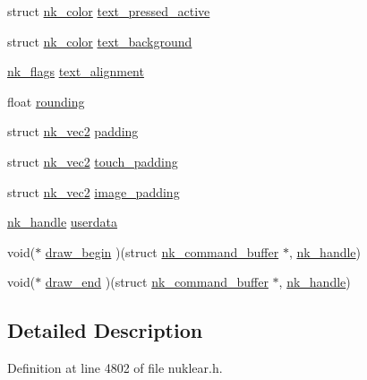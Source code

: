 \begin{DoxyCompactItemize}
struct \mbox{\hyperlink{structnk__color}{nk\+\_\+color}} \mbox{\hyperlink{structnk__style__selectable_aecb0b9ee1fb0cdd7d2d42f254c344cd6}{text\+\_\+pressed\+\_\+active}}
\item 
struct \mbox{\hyperlink{structnk__color}{nk\+\_\+color}} \mbox{\hyperlink{structnk__style__selectable_af004e1c08e65f86c0d97f6cf38cc6387}{text\+\_\+background}}
\item 
\mbox{\hyperlink{nuklear_8h_a19e0e2f6db4862891d9801de3c3da323}{nk\+\_\+flags}} \mbox{\hyperlink{structnk__style__selectable_ad5269b824144fa486e83f982767c71ab}{text\+\_\+alignment}}
\item 
float \mbox{\hyperlink{structnk__style__selectable_a2c0def63204e22489a0b5020b10baf57}{rounding}}
\item 
struct \mbox{\hyperlink{structnk__vec2}{nk\+\_\+vec2}} \mbox{\hyperlink{structnk__style__selectable_a2c770699aeb61661fc489c3c6f8e29fb}{padding}}
\item 
struct \mbox{\hyperlink{structnk__vec2}{nk\+\_\+vec2}} \mbox{\hyperlink{structnk__style__selectable_a7c609f101e3d34ab2efd47512261285e}{touch\+\_\+padding}}
\item 
struct \mbox{\hyperlink{structnk__vec2}{nk\+\_\+vec2}} \mbox{\hyperlink{structnk__style__selectable_a6a88ded1389d9a57728e885d9cfae6e5}{image\+\_\+padding}}
\item 
\mbox{\hyperlink{unionnk__handle}{nk\+\_\+handle}} \mbox{\hyperlink{structnk__style__selectable_ab0cdeefe700feb442aefb82a49aa930b}{userdata}}
\item 
void($\ast$ \mbox{\hyperlink{structnk__style__selectable_a5f8962de9e8498f98ca3a1d7b2d5e07c}{draw\+\_\+begin}} )(struct \mbox{\hyperlink{structnk__command__buffer}{nk\+\_\+command\+\_\+buffer}} $\ast$, \mbox{\hyperlink{unionnk__handle}{nk\+\_\+handle}})
\item 
void($\ast$ \mbox{\hyperlink{structnk__style__selectable_aeee4d32977d1afe0c1980d5fae22fa31}{draw\+\_\+end}} )(struct \mbox{\hyperlink{structnk__command__buffer}{nk\+\_\+command\+\_\+buffer}} $\ast$, \mbox{\hyperlink{unionnk__handle}{nk\+\_\+handle}})
\end{DoxyCompactItemize}


\subsection{Detailed Description}


Definition at line 4802 of file nuklear.\+h.



